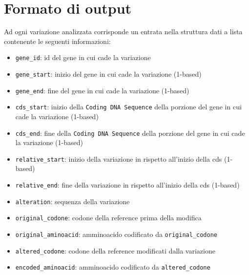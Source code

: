 \documentclass[11pt,italian]{article}
\begin{document}
\newpage
\section{Formato di output}
Ad ogni variazione analizzata corrisponde un entrata nella struttura dati a lista contenente le seguenti informazioni:
\begin{itemize}
    \item \lstinline{gene_id}: id del gene in cui cade la variazione
    \item \lstinline{gene_start}: inizio del gene in cui cade la variazione (1-based)
    \item \lstinline{gene_end}: fine del gene in cui cade la variazione (1-based)
    \item \lstinline{cds_start}: inizio della \lstinline{Coding DNA Sequence} della porzione del gene in cui cade la variazione (1-based)
    \item \lstinline{cds_end}: fine della \lstinline{Coding DNA Sequence} della porzione del gene in cui cade la variazione (1-based)
    \item \lstinline{relative_start}: inizio della variazione in rispetto all'inizio della cds (1-based)
    \item \lstinline{relative_end}: fine della variazione in rispetto all'inizio della cds (1-based)
    \item \lstinline{alteration}: sequenza della variazione
    \item \lstinline{original_codone}: codone della reference prima della modifica
    \item \lstinline{original_aminoacid}: amminoacido codificato da \lstinline{original_codone}
    \item \lstinline{altered_codone}: codone della reference modificati dalla variazione
    \item \lstinline{encoded_aminoacid}: amminoacido codificato da \lstinline{altered_codone}
\end{itemize}
\end{document}
